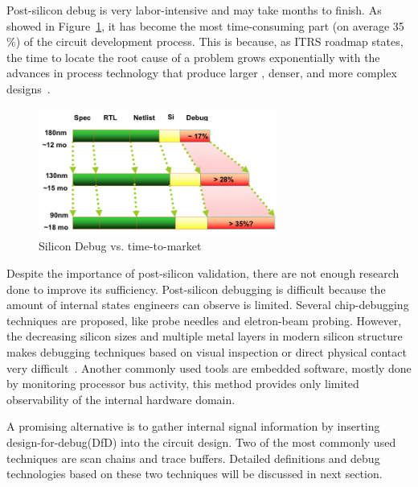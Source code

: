 \documentclass[12pt,frontmatter,copyright,thesis]{usfmanus}
\begin{document}
Post-silicon debug is very labor-intensive and may
take months to finish. As showed in Figure~\ref{debugt},
it has become the most time-consuming part (on average 35$\%$) of the
circuit development process. This is because, as ITRS roadmap states, the time to locate the root cause of a problem
grows exponentially with the advances in process
technology that produce larger , denser, and more complex designs~\cite{Abramovici:2006:RDI:1146909.1146916}.
\begin{figure}[h]
\centering
\includegraphics[width=0.7\textwidth]{debugtime.png}
\caption{Silicon Debug vs. time-to-market}
\label{debugt}
\end{figure}

Despite the importance of post-silicon validation, there are not
enough research done to improve its sufficiency.
Post-silicon debugging is difficult because
the amount of internal states engineers can
observe is limited. Several chip-debugging techniques are proposed,
like probe needles and eletron-beam probing.
However, the decreasing silicon sizes and multiple metal layers
in modern silicon structure makes 
debugging techniques based on visual inspection or direct physical contact very difficult~\cite{1003792}.
Another commonly used tools are embedded software, mostly done by monitoring
processor bus activity, this method provides only limited observability
of the internal hardware domain\cite{leatherman2003processor}.


A promising alternative is to gather internal signal information
by inserting
 design-for-debug(DfD) into
the circuit design.
Two of the most commonly used techniques are scan chains 
and trace buffers. Detailed definitions and 
debug technologies based on these two techniques will be discussed
in next section.
\end{document}
